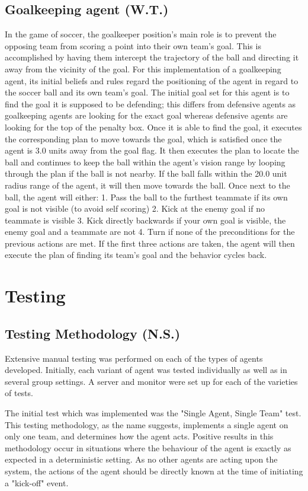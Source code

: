 \documentclass[conference]{IEEEtran}
\begin{document}
\subsection{Goalkeeping agent (W.T.)}
In the game of soccer, the goalkeeper position's main role is to prevent the opposing team from scoring a point into their own team's goal.
This is accomplished by having them intercept the trajectory of the ball and directing it away from the vicinity of the goal.
For this implementation of a goalkeeping agent, its initial beliefs and rules regard the positioning of the agent in regard to the soccer ball and its own team's goal.
The initial goal set for this agent is to find the goal it is supposed to be defending;
this differs from defensive agents as goalkeeping agents are looking for the exact goal whereas defensive agents are looking for the top of the penalty box.
Once it is able to find the goal, it executes the corresponding plan to move towards the goal, which is satisfied once the agent is 3.0 units away from the goal flag.
It then executes the plan to locate the ball and continues to keep the ball within the agent's vision range by looping through the plan if the ball is not nearby.
If the ball falls within the 20.0 unit radius range of the agent, it will then move towards the ball.
Once next to the ball, the agent will either: 1.
Pass the ball to the furthest teammate if its own goal is not visible (to avoid self scoring) 2. Kick at the enemy goal if no teammate is visible 3.
Kick directly backwards if your own goal is visible, the enemy goal and a teammate are not 4.
Turn if none of the preconditions for the previous actions are met.
If the first three actions are taken, the agent will then execute the plan of finding its team's goal and the behavior cycles back.

\section{Testing}
\subsection{Testing Methodology (N.S.)}
Extensive manual testing was performed on each of the types of agents developed.
Initially, each variant of agent was tested individually as well as in several group settings.
A server and monitor were set up for each of the varieties of tests.

The initial test which was implemented was the "Single Agent, Single Team" test.
This testing methodology, as the name suggests, implements a single agent on only one team, and determines how the agent acts.
Positive results in this methodology occur in situations where the behaviour of the agent is exactly as expected in a deterministic setting.
As no other agents are acting upon the system, the actions of the agent should be directly known at the time of initiating a "kick-off" event.
\end{document}
